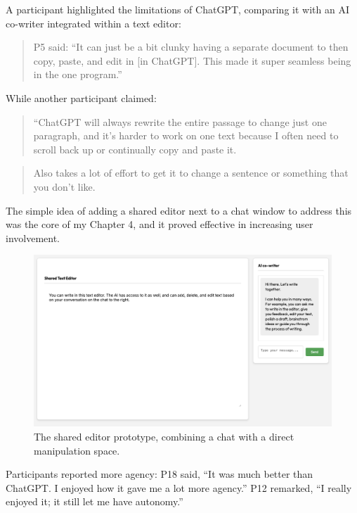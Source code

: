 A participant highlighted the limitations of ChatGPT, comparing it with an AI co-writer integrated within a text editor:
\begin{quote}
P5 said: “It can just be a bit clunky having a separate document to then copy, paste, and edit in [in ChatGPT]. This made it super seamless being in the one program.”
\end{quote}

While another participant claimed:

\begin{quote}
“ChatGPT will always rewrite the entire passage to change just one paragraph, and it’s harder to work on one text because I often need to scroll back up or continually copy and paste it.
\end{quote}


\begin{quote}
Also takes a lot of effort to get it to change a sentence or something that you don't like.
\end{quote}


The simple idea of adding a shared editor next to a chat window to address this was the core of my Chapter 4, and it proved effective in increasing user involvement.
\begin{figure}[H]
    \centering
    \includegraphics[width=1\linewidth]{sharededitor.png}
    \caption{The shared editor prototype, combining a chat with a direct manipulation space.}
    \label{fig:shared-editor}
\end{figure}

Participants reported more agency: P18 said, “It was much better than ChatGPT. I enjoyed how it gave me a lot more agency.” P12 remarked, “I really enjoyed it; it still let me have autonomy.” 



